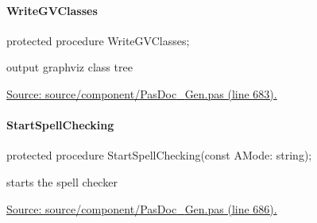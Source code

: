 \documentclass{report}
\newif\ifpdf
\begin{document}
\paragraph*{WriteGVClasses}\hspace*{\fill}

\label{PasDoc_Gen.TDocGenerator-WriteGVClasses}
\begin{list}{}{
\setlength{\itemindent}{0cm}
\setlength{\listparindent}{0cm}
\setlength{\leftmargin}{\evensidemargin}
\addtolength{\leftmargin}{\tmplength}
\settowidth{\labelsep}{X}
\addtolength{\leftmargin}{\labelsep}
\setlength{\labelwidth}{\tmplength}
}
\item[\textbf{Declaration}\hfill]
\ifpdf
\begin{flushleft}
\fi
\begin{ttfamily}
protected procedure WriteGVClasses;\end{ttfamily}

\ifpdf
\end{flushleft}
\fi

\par
\item[\textbf{Description}]
output graphviz class tree\par
\href{https://github.com/pasdoc/pasdoc/blob/master/source/component/PasDoc_Gen.pas#L683}{Source: source/component/PasDoc{\_}Gen.pas (line 683).}

\end{list}
\paragraph*{StartSpellChecking}\hspace*{\fill}

\label{PasDoc_Gen.TDocGenerator-StartSpellChecking}
\begin{list}{}{
\setlength{\itemindent}{0cm}
\setlength{\listparindent}{0cm}
\setlength{\leftmargin}{\evensidemargin}
\addtolength{\leftmargin}{\tmplength}
\settowidth{\labelsep}{X}
\addtolength{\leftmargin}{\labelsep}
\setlength{\labelwidth}{\tmplength}
}
\item[\textbf{Declaration}\hfill]
\ifpdf
\begin{flushleft}
\fi
\begin{ttfamily}
protected procedure StartSpellChecking(const AMode: string);\end{ttfamily}

\ifpdf
\end{flushleft}
\fi

\par
\item[\textbf{Description}]
starts the spell checker\par
\href{https://github.com/pasdoc/pasdoc/blob/master/source/component/PasDoc_Gen.pas#L686}{Source: source/component/PasDoc{\_}Gen.pas (line 686).}

\end{list}
\end{document}
